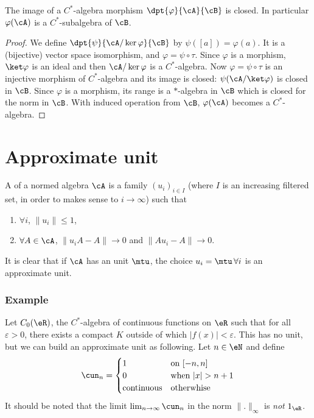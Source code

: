 \begin{corollary}
The image of a $C^*$-algebra morphism $\dpt{\varphi}{\cA}{\cB}$ is closed. In particular $\varphi(\cA)$ is a $C^*$-subalgebra of $\cB$.
\end{corollary}

\begin{proof}
We  define $\dpt{\psi}{\cA/\ker\varphi}{\cB}$ by $\psi([a])=\varphi(a)$. It is a (bijective) vector space isomorphism, and $\varphi=\psi\circ\tau$. Since $\varphi$ is a morphism, $\ket \varphi$ is an ideal and then $\cA/\ker\varphi$ is a $C^*$-algebra. Now $\varphi=\psi\circ\tau$ is an injective morphism of $C^*$-algebra and its image is closed: $\psi(\cA/\ket\varphi)$ is closed in $\cB$. Since $\varphi$ is a morphism, its range is a $*$-algebra in $\cB$ which is closed for the norm in $\cB$. With induced operation from $\cB$, $\varphi(\cA)$ becomes a $C^*$-algebra.
\end{proof}

\section{Approximate unit}

\begin{definition}
 A  of a normed algebra $\cA$ is a family $(u_i)_{i\in I}$ (where $I$ is an increasing filtered set, in order to makes sense to $i\to\infty$) such 
that 
\begin{enumerate}
\item  $\forall i$, $\|u_i\|\leq 1$,
\item  $\forall A\in\cA$, $\|u_iA-A\|\to 0$ and $\|Au_i-A\|\to 0$. \label{enuoii}
\end{enumerate}
\label{def:app_unit}
\end{definition}
It is clear that if $\cA$ has an unit $\mtu$, the choice $u_i=\mtu\,\forall i$ is an approximate unit.

\subsubsection*{Example}

Let $C_0(\eR)$, the $C^*$-algebra of continuous functions on $\eR$ such that for all $\varepsilon>0$, there exists a compact $K$ outside of which $| f(x) |<\varepsilon$. This has no unit, but we can build an approximate unit as following. Let $n\in\eN$ and define
\[ 
  \cun_n=
\begin{cases}
 1& \textrm{on $[-n,n]$}\\
 0&\textrm{when $| x |>n+1$}\\
\textrm{continuous}&\textrm{otherwhise}
\end{cases}
\]
It should be noted that the limit $\lim_{n\to\infty}\cun_n$ in the norm  $\| . \|_{\infty}$ is \emph{not} $1_{\eR}$. 

